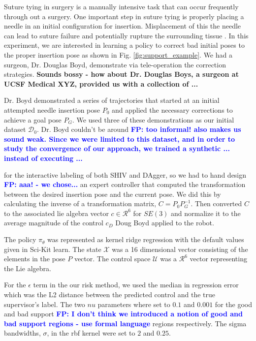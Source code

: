 \documentclass[10pt, conference]{ieeeconf}      %
\newcommand{\fpnote}[1]{\ifthenelse{\boolean{include-notes}}%
 {\textcolor{blue}{\textbf{FP: #1}}}{}}
\begin{document}
Suture tying in surgery is a manually intensive task that can occur frequently through out a surgery. One important step
in suture tying is properly placing a needle in an initial configuration for insertion. Misplacement of this the needle
can lead to suture failure and potentially rupture the surrounding tissue \cite{liu2015optimal}. In this experiment, we
are interested in learning a policy to correct bad initial poses to the proper insertion pose as shown in Fig.
\ref{fig:support_example}. We had a surgeon, Dr. Douglas Boyd, demonstrate via tele-operation the correction strategies.
\textbf{Sounds bossy - how about Dr. Douglas Boys, a surgeon at UCSF Medical XYZ, provided us with a collection of ...}

Dr. Boyd demonstrated a series of trajectories that started at an initial attempted needle insertion pose $P_0$ and
applied the necessary corrections to achieve a goal pose $P_G$. We used three of these demonstrations as our initial
dataset $\mathcal{D}_0$. Dr. Boyd couldn't be around \fpnote{too informal! also makes us sound weak. Since we were
    limited to this dataset, and in order to study the convergence of our approach, we trained a synthetic
... instead of executing ...}

for the interactive labeling of both SHIV and DAgger, so we had to hand design \fpnote{aaa! - we chose...} an expert controller that computed the transformation between the desired insertion pose and the current pose. We did this by calculating the inverse of a transformation matrix, $C = P_0P_G^{-1}$. Then converted $C$ to the associated lie algebra vector $c \in \mathcal{R}^6$ for $SE(3)$ and normalize it to the average magnitude of the control $c_D$ Doug Boyd applied to the robot. 

The policy $\pi_{\theta}$ was represented as kernel ridge regression with the default values given in Sci-Kit learn. The state $\mathcal{X}$ was  a 16 dimensional vector consisting of the elements in the pose $P$ vector. The control space $\mathcal{U}$ was a $\mathcal{R}^6$ vector representing the Lie algebra. 

For the $\epsilon$ term in the our risk method, we used the median in regression error which was the L2 distance between the predicted control and the true supervisor's label. The two $nu$ parameters where set to $0.1$ and $0.001$ for the good and bad support 
\fpnote{I don't think we introduced a notion of good and bad support regions - use formal language}
regions respectively. The sigma bandwidths, $\sigma$, in the rbf kernel were set to $2$ and $0.25$.
\end{document}
